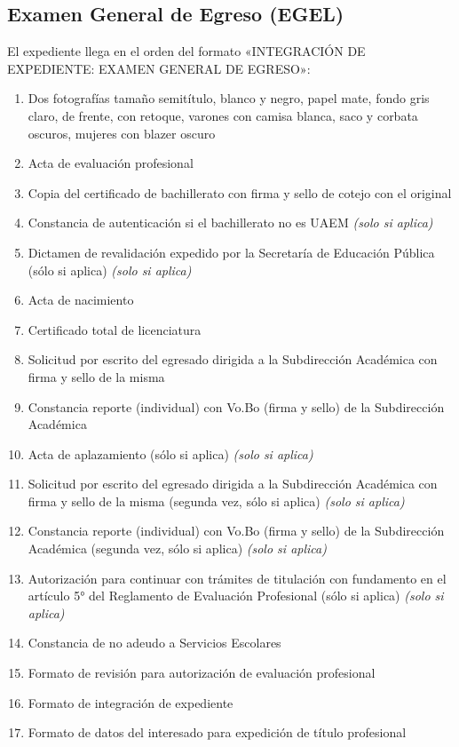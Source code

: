 \subsection{Examen General de Egreso (EGEL)}
El expediente llega en el orden del formato «INTEGRACIÓN DE EXPEDIENTE: EXAMEN GENERAL DE EGRESO»:
\begin{enumerate}
  \item Dos fotografías tamaño semitítulo, blanco y negro, papel mate, fondo gris claro, de frente, con retoque, varones con camisa blanca, saco y corbata oscuros, mujeres con blazer oscuro
  \item Acta de evaluación profesional
  \item Copia del certificado de bachillerato con firma y sello de cotejo con el original
  \item Constancia de autenticación si el bachillerato no es UAEM \emph{(solo si aplica)}
  \item Dictamen de revalidación expedido por la Secretaría de Educación Pública (sólo si aplica) \emph{(solo si aplica)}
  \item Acta de nacimiento
  \item Certificado total de licenciatura
  \item Solicitud por escrito del egresado dirigida a la Subdirección Académica con firma y sello de la misma
  \item Constancia reporte (individual) con Vo.Bo (firma y sello) de la Subdirección Académica
  \item Acta de aplazamiento (sólo si aplica) \emph{(solo si aplica)}
  \item Solicitud por escrito del egresado dirigida a la Subdirección Académica con firma y sello de la misma (segunda vez, sólo si aplica) \emph{(solo si aplica)}
  \item Constancia reporte (individual) con Vo.Bo (firma y sello) de la Subdirección Académica (segunda vez, sólo si aplica) \emph{(solo si aplica)}
  \item Autorización para continuar con trámites de titulación con fundamento en el artículo 5° del Reglamento de Evaluación Profesional (sólo si aplica) \emph{(solo si aplica)}
  \item Constancia de no adeudo a Servicios Escolares
  \item Formato de revisión para autorización de evaluación profesional
  \item Formato de integración de expediente
  \item Formato de datos del interesado para expedición de título profesional
\end{enumerate}
